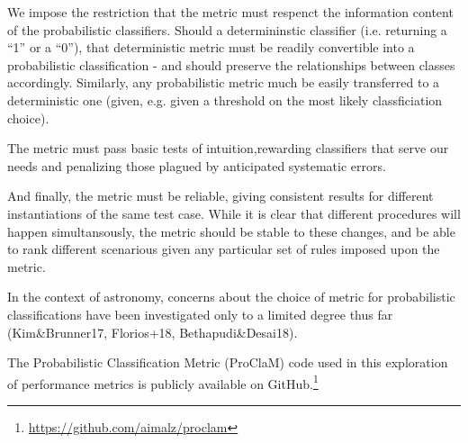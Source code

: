 We impose the restriction that the metric must respenct the information content of the probabilistic classifiers.
Should a determininstic classifier (i.e. returning a ``1'' or a ``0''), that deterministic metric must be readily convertible into a probabilistic classification - and should preserve the relationships between classes accordingly.
Similarly, any probabilistic metric much be easily transferred to a deterministic one (given, e.g. given a threshold on the most likely classficiation choice).

The metric must pass basic tests of intuition,rewarding classifiers that serve our needs and penalizing those plagued by anticipated systematic errors.


And finally, the metric must be reliable, giving consistent results for different instantiations of the same test case.
While it is clear that different procedures will happen simultansously, the metric should be stable to these changes, and be able to rank different scenarious given any particular set of rules imposed upon the metric.

In the context of astronomy, concerns about the choice of metric for probabilistic classifications have been investigated only to a limited degree thus far (Kim\&Brunner17, Florios+18, Bethapudi\&Desai18).

The Probabilistic Classification Metric (ProClaM) code used in this exploration of performance metrics is publicly available on GitHub.\footnote{\url{https://github.com/aimalz/proclam}}
